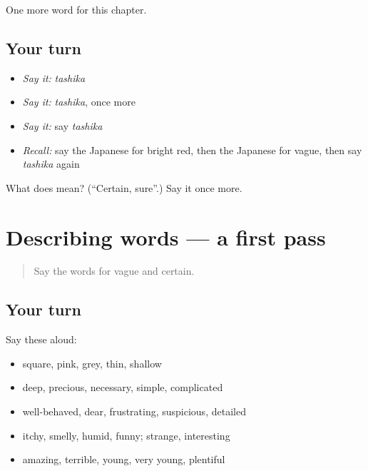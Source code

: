 \begin{grammarlens}[title={What you've built}]
One more word for this chapter.
\end{grammarlens}

\subsection*{Your turn}
\begin{itemize}
\raggedright
  \item \emph{Say it:} \emph{tashika}
  \item \emph{Say it:} \emph{tashika}, once more
  \item \emph{Say it:} say \emph{tashika}
  \item \emph{Recall:} say the Japanese for bright red, then the Japanese for vague, then say \emph{tashika} again
\end{itemize}

\begin{tcolorbox}[breakable,colback=teal!4,colframe=teal!35!black,title={Before you move on}]
What does  mean? (\textquotedblleft{}Certain, sure\textquotedblright{}.) Say it once more.
\end{tcolorbox}
\section[(dialogue)]{Describing words — a first pass}

\label{lesson:JA-R130-first-pass-describing-words}



\begin{quote}
Say the words for vague and certain.
\end{quote}

\subsection*{Your turn}
Say these aloud:

\begin{itemize}
\raggedright
  \item square, pink, grey, thin, shallow
  \item deep, precious, necessary, simple, complicated
  \item well-behaved, dear, frustrating, suspicious, detailed
  \item itchy, smelly, humid, funny; strange, interesting
  \item amazing, terrible, young, very young, plentiful
\end{itemize}

